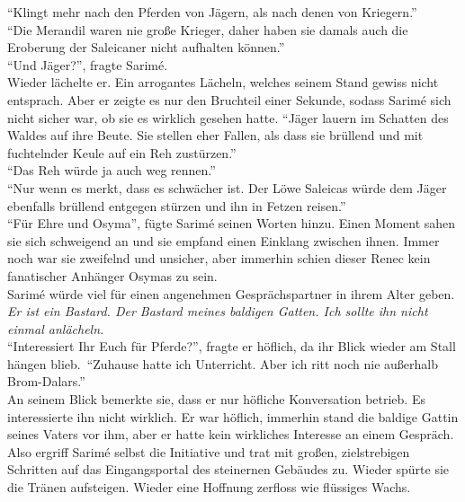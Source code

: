 ``Klingt mehr nach den Pferden von Jägern, als nach denen von Kriegern.''\\
``Die Merandil waren nie große Krieger, daher haben sie damals auch die Eroberung der Saleicaner 
nicht aufhalten können.''\\
``Und Jäger?'', fragte Sarimé.\\
Wieder lächelte er. Ein arrogantes Lächeln, welches seinem Stand gewiss nicht entsprach. Aber er 
zeigte es nur den Bruchteil einer Sekunde, sodass Sarimé sich nicht sicher war, ob sie es wirklich 
gesehen hatte. 
``Jäger lauern im Schatten des Waldes auf ihre Beute. Sie stellen eher Fallen, als dass sie 
brüllend und mit fuchtelnder Keule auf ein Reh zustürzen.''\\
``Das Reh würde ja auch weg rennen.''\\
``Nur wenn es merkt, dass es schwächer ist. Der Löwe Saleicas würde dem Jäger ebenfalls brüllend 
entgegen stürzen und ihn in Fetzen reisen.''\\
``Für Ehre und Osyma'', fügte Sarimé seinen Worten hinzu. Einen Moment sahen sie sich schweigend an 
und sie empfand einen Einklang zwischen ihnen. Immer noch war sie zweifelnd und unsicher, aber 
immerhin schien dieser Renec kein fanatischer Anhänger Osymas zu sein. \\
Sarimé würde viel für einen angenehmen Gesprächspartner in ihrem Alter geben. \textit{Er ist ein 
Bastard. Der Bastard meines baldigen Gatten. Ich sollte ihn nicht einmal anlächeln.}\\
``Interessiert Ihr Euch für Pferde?'', fragte er höflich, da ihr Blick wieder am Stall hängen 
blieb.\ 
``Zuhause hatte ich Unterricht. Aber ich ritt noch nie außerhalb Brom-Dalars.''\\
An seinem Blick bemerkte sie, dass er nur höfliche Konversation betrieb. Es interessierte ihn nicht 
wirklich. Er war höflich, immerhin stand die baldige Gattin seines Vaters vor ihm, aber er hatte 
kein wirkliches Interesse an einem Gespräch. Also ergriff Sarimé selbst die Initiative und trat mit 
großen, zielstrebigen Schritten auf das Eingangsportal des steinernen Gebäudes zu. Wieder spürte 
sie die Tränen aufsteigen. Wieder eine Hoffnung zerfloss wie flüssiges Wachs. \\


